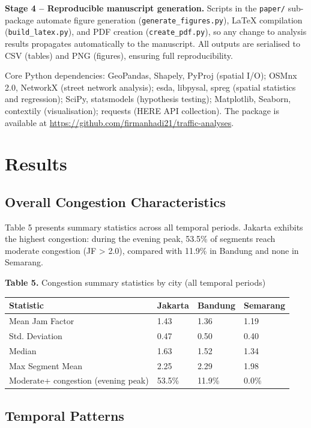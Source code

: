 \documentclass[12pt,a4paper]{article}
\begin{document}
\textbf{Stage 4 -- Reproducible manuscript generation.} Scripts in the \texttt{paper/} sub-package automate figure generation (\texttt{generate\_figures.py}), LaTeX compilation (\texttt{build\_latex.py}), and PDF creation (\texttt{create\_pdf.py}), so any change to analysis results propagates automatically to the manuscript. All outputs are serialised to CSV (tables) and PNG (figures), ensuring full reproducibility.

Core Python dependencies: GeoPandas, Shapely, PyProj (spatial I/O); OSMnx 2.0, NetworkX (street network analysis); esda, libpysal, spreg (spatial statistics and regression); SciPy, statsmodels (hypothesis testing); Matplotlib, Seaborn, contextily (visualisation); requests (HERE API collection). The package is available at \url{https://github.com/firmanhadi21/traffic-analyses}.



\section{Results}

\subsection{Overall Congestion Characteristics}

Table 5 presents summary statistics across all temporal periods. Jakarta exhibits the highest congestion: during the evening peak, 53.5\% of segments reach moderate congestion (JF > 2.0), compared with 11.9\% in Bandung and none in Semarang.

\textbf{Table 5.} Congestion summary statistics by city (all temporal periods)

\begin{longtable}[]{@{}llll@{}}
\toprule\noalign{}
Statistic & Jakarta & Bandung & Semarang \\
\midrule\noalign{}
\endhead
\bottomrule\noalign{}
\endlastfoot
Mean Jam Factor & 1.43 & 1.36 & 1.19 \\
Std. Deviation & 0.47 & 0.50 & 0.40 \\
Median & 1.63 & 1.52 & 1.34 \\
Max Segment Mean & 2.25 & 2.29 & 1.98 \\
Moderate+ congestion (evening peak) & 53.5\% & 11.9\% & 0.0\% \\
\end{longtable}

\subsection{Temporal Patterns}
\end{document}
